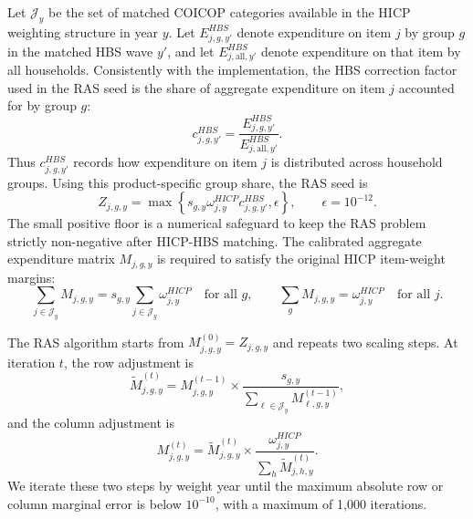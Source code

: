 \documentclass[11pt]{article}
\begin{document}
Let $\mathcal{J}_y$ be the set of matched COICOP categories available in the HICP weighting
structure in year $y$. Let $E^{HBS}_{j,g,y'}$ denote expenditure on item $j$ by group $g$ in the
matched HBS wave $y'$, and let $E^{HBS}_{j,\mathrm{all},y'}$ denote expenditure on that item by all
households. Consistently with the implementation, the HBS correction factor used in the RAS seed is
the share of aggregate expenditure on item $j$ accounted for by group $g$:
\begin{equation}
c^{HBS}_{j,g,y'}
=
\frac{E^{HBS}_{j,g,y'}}{E^{HBS}_{j,\mathrm{all},y'}}.
\end{equation}
Thus $c^{HBS}_{j,g,y'}$ records how expenditure on item $j$ is distributed across household groups.
Using this product-specific group share, the RAS seed is
\begin{equation}
Z_{j,g,y}
=
\max\left\{
s_{g,y}\omega^{HICP}_{j,y}c^{HBS}_{j,g,y'},\epsilon
\right\},
\qquad
\epsilon=10^{-12}.
\end{equation}
The small positive floor is a numerical safeguard to keep the RAS problem strictly non-negative
after HICP-HBS matching. The calibrated aggregate expenditure matrix $M_{j,g,y}$ is required to
satisfy the original HICP item-weight margins:
\begin{equation}
\sum_{j \in \mathcal{J}_y} M_{j,g,y}
=
s_{g,y}\sum_{j \in \mathcal{J}_y}\omega^{HICP}_{j,y}
\quad \text{for all } g,
\qquad
\sum_g M_{j,g,y}
=
\omega^{HICP}_{j,y}
\quad \text{for all } j.
\end{equation}

The RAS algorithm starts from $M^{(0)}_{j,g,y}=Z_{j,g,y}$ and repeats two scaling steps. At
iteration $t$, the row adjustment is
\begin{equation}
\widetilde{M}^{(t)}_{j,g,y}
=
M^{(t-1)}_{j,g,y}
\times
\frac{
s_{g,y}%
}{
\sum_{\ell \in \mathcal{J}_y} M^{(t-1)}_{\ell,g,y}
},
\end{equation}
and the column adjustment is
\begin{equation}
M^{(t)}_{j,g,y}
=
\widetilde{M}^{(t)}_{j,g,y}
\times
\frac{
\omega^{HICP}_{j,y}
}{
\sum_h \widetilde{M}^{(t)}_{j,h,y}
}.
\end{equation}
We iterate these two steps by weight year until the maximum absolute row or column marginal error is
below $10^{-10}$, with a maximum of 1,000 iterations.
\end{document}
